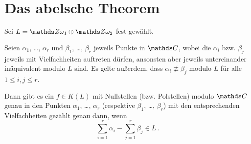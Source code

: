 \section{Das abelsche Theorem}

Sei $L = \ZZ\omega_1 \oplus \ZZ\omega_2$ fest gewählt.

\begin{satz}
Seien $\alpha_1$, \ldots, $\alpha_r$ und $\beta_1$, \ldots, $\beta_r$ jeweils Punkte in $\CC$, wobei die $\alpha_i$ bzw. $\beta_j$ jeweils mit Vielfachheiten auftreten dürfen, ansonsten aber jeweils untereinander inäquivalent modulo $L$ sind.
Es gelte außerdem, dass $\alpha_i \not\equiv \beta_j$ modulo $L$ für alle $1 \leq i,j \leq r$.

Dann gibt es ein $f\in K(L)$ mit Nullstellen (bzw. Polstellen) modulo $\CC$ genau in den Punkten $\alpha_1$, \ldots, $\alpha_r$ (respektive $\beta_1$, \ldots, $\beta_r$) mit den entsprechenden Vielfachheiten gezählt genau dann, wenn
\begin{equation}\label{eqn:abelsches-thm}
	\sum_{i=1}^r \alpha_i - \sum_{j=1}^r \beta_j \in L
	\,.
\end{equation}
\end{satz}

